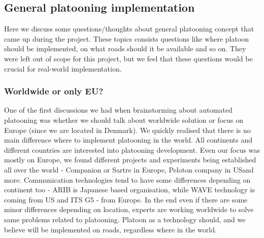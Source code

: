 \subsection{General platooning implementation}
Here we discuss some questions/thoughts about general platooning concept that came up during the project. These topics consists questions like where platoon should be implemented, on what roads should it be available and so on. They were left out of scope for this project, but we feel that these questions would be crucial for real-world implementation.
%
\subsubsection{Worldwide or only EU?}
%
One of the first discussions we had when brainstorming about automated platooning was whether we should talk about worldwide solution or focus on Europe (since we are located in Denmark). We quickly realised that there is no main difference where to implement platooning in the world. All continents and different countries are interested into platooning development. Even our focus was mostly on Europe, we found different projects and experiments being established all over the world - Companion\cite{2016CompanionProject} or Sartre\cite{Chan2012ProjectSARTRE} in Europe, Peloton company in US\footnotemark and more.
Communication technologies tend to have some differences depending on continent too - ARIB is Japanese based organisation, while WAVE technology is coming from US and ITS G5 - from Europe.
In the end even if there are some minor differences depending on location, experts are working worldwide to solve same problems related to platooning. Platoon as a technology should, and we believe will be implemented on roads, regardless where in the world.
%
